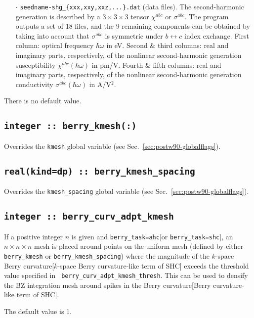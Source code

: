 \begin{itemize}
\begin{itemize}
\item[$\cdot$] {\tt seedname-shg\_{\{xxx,xxy,xxz,...\}.dat}}
  (data files).  The second-harmonic generation is described by a $3\times3\times3$ tensor $\chi^{abc}$ or $\sigma^{abc}$. 
  The program outputs a set of 18 files, and the 9 remaining components 
  can be obtained by taking into account that $\sigma^{abc}$ is 
  symmetric under $b\leftrightarrow c$ index exchange.
  First column: optical frequency $\hbar\omega$ in
  eV. Second \& third columns: real and imaginary parts, respectively, of the nonlinear second-harmonic generation susceptibility $\chi^{abc}(\hbar\omega)$ in pm/V. Fourth \& fifth columns: real and imaginary parts, respectively, of the nonlinear second-harmonic generation conductivity $\sigma^{abc}(\hbar\omega)$ in A/V$^{2}$. 
  
\end{itemize}

\end{itemize}
There is no default value.


\subsection[berry\_kmesh]{\tt integer :: berry\_kmesh(:)}
Overrides the \verb#kmesh# global variable (see
Sec.~\ref{sec:postw90-globalflags}).

\subsection[berry\_kmesh\_spacing]{\tt real(kind=dp) ::
  berry\_kmesh\_spacing}
Overrides the \verb#kmesh_spacing# global variable (see
Sec.~\ref{sec:postw90-globalflags}).


\subsection[berry\_adpt\_kmesh]{\tt integer :: berry\_curv\_adpt\_kmesh}
If a positive integer $n$ is given and {\tt berry\_task=ahc}[or {\tt berry\_task=shc}], an
$n\times n\times n$ mesh is placed around points on the uniform mesh
(defined by either {\tt berry\_kmesh} or {\tt berry\_kmesh\_spacing})
where the magnitude of the $k$-space Berry curvature[$k$-space Berry curvature-like term of SHC] exceeds the
threshold value specified in {\tt
  berry\_curv\_adpt\_kmesh\_thresh}. This can be used to densify the
BZ integration mesh around spikes in the Berry curvature[Berry curvature-like term of SHC].

The default value is 1.


